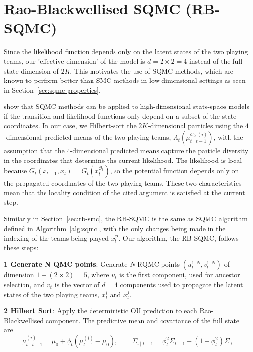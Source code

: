 \section{Rao-Blackwellised SQMC (RB-SQMC)}
\label{sec:rb-sqmc}

Since the likelihood function depends only on the latent states of the two playing teams, our 'effective dimension' of the model is $d = 2 \times 2 = 4$ instead of the full state dimension of $2K$. This motivates the use of SQMC methods, which are known to perform better than SMC methods in low-dimensional settings as seen in Section~\ref{sec:sqmc-properties}. 

\citet{chopingerber2017sqmcintroduction} show that SQMC methods can be applied to high-dimensional state-space models if the transition and likelihood functions only depend on a subset of the state coordinates. In our case, we Hilbert-sort the $2K$-dimensional particles using the $4$-dimensional predicted means of the two playing teams, $\Lambda_t(\mu_{t \mid t-1}^{\mathcal{O}_t, (i)})$, with the assumption that the $4$-dimensional predicted means capture the particle diversity in the coordinates that determine the current likelihood. The likelihood is local because $G_t(x_{t-1}, x_t) = G_t(x_t^{\mathcal{O}_t})$, so the potential function depends only on the propagated coordinates of the two playing teams. These two characteristics mean that the locality condition of the cited argument is satisfied at the current step. 

Similarly in Section~\ref{sec:rb-smc}, the RB-SQMC is the same as SQMC algorithm defined in Algorithm~\ref{alg:sqmc}, with the only changes being made in the indexing of the teams being played $x_t^{\mathcal{O}}$. Our algorithm, the RB-SQMC, follows these steps:

\textbf{1 Generate N QMC points}: Generate $N$ RQMC points $(u_t^{1:N}, v_t^{1:N})$ of dimension $1 + (2 \times 2) = 5$, where $u_t$ is the first component, used for ancestor selection, and $v_t$ is the vector of $d = 4$ components used to propagate the latent states of the two playing teams, $x_t^i$ and $x_t^j$.

\textbf{2 Hilbert Sort}: Apply the deterministic OU prediction to each Rao-Blackwellised component. The predictive mean and covariance of the full state are
\begin{equation*}
    \mu_{t\mid t-1}^{(i)} = \mu_0 + \phi_t \left( \mu_{t-1}^{(i)} - \mu_0 \right), \qquad
    \Sigma_{t\mid t-1} = \phi_t^2 \Sigma_{t-1} + \left(1 - \phi_t^2\right) \Sigma_0
\end{equation*}

